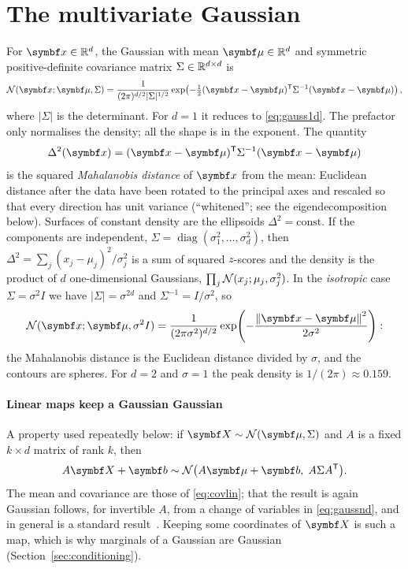 \documentclass[11pt]{article}
\begin{document}
\section{The multivariate Gaussian}\label{sec:gaussnd}

For $\x \in \R^d$, the Gaussian with mean $\vmu \in \R^d$ and symmetric positive-definite covariance matrix
$\Sigma \in \mathbb{R}^{d \times d}$ is
\begin{equation}\label{eq:gaussnd}
  \Normal(\x; \vmu, \Sigma) = \frac{1}{(2\pi)^{d/2} \lvert\Sigma\rvert^{1/2}}
  \exp\!\left( -\tfrac12 (\x - \vmu)\T \Sigma^{-1} (\x - \vmu) \right),
\end{equation}
where $\lvert\Sigma\rvert$ is the determinant. For $d = 1$ it reduces to \eqref{eq:gauss1d}. The prefactor only
normalises the density; all the shape is in the exponent. The quantity
\[
  \Delta^2(\x) = (\x - \vmu)\T \Sigma^{-1} (\x - \vmu)
\]
is the squared \emph{Mahalanobis distance} of $\x$ from the mean: Euclidean distance after the data have been
rotated to the principal axes and rescaled so that every direction has unit variance (``whitened''; see the
eigendecomposition below). Surfaces of constant density are the ellipsoids
$\Delta^2 = \text{const}$. If the components are independent, $\Sigma = \operatorname{diag}(\sigma_1^2, \dots,
\sigma_d^2)$, then $\Delta^2 = \sum_j (x_j - \mu_j)^2/\sigma_j^2$ is a sum of squared $z$-scores and the density is
the product of $d$ one-dimensional Gaussians, $\prod_j \mathcal{N}(x_j; \mu_j, \sigma_j^2)$. In the \emph{isotropic} case
$\Sigma = \sigma^2 I$ we have $\lvert\Sigma\rvert = \sigma^{2d}$ and $\Sigma^{-1} = I/\sigma^2$, so
\begin{equation}\label{eq:gaussiso}
  \Normal(\x; \vmu, \sigma^2 I) = \frac{1}{(2\pi\sigma^2)^{d/2}} \exp\!\left( -\frac{\norm{\x - \vmu}^2}{2\sigma^2} \right):
\end{equation}
the Mahalanobis distance is the Euclidean distance divided by $\sigma$, and the contours are spheres. For $d = 2$
and $\sigma = 1$ the peak density is $1/(2\pi) \approx 0.159$.

\paragraph{Linear maps keep a Gaussian Gaussian} A property used repeatedly below: if $\X \sim \Normal(\vmu, \Sigma)$
and $A$ is a fixed $k \times d$ matrix of rank $k$, then
\begin{equation}\label{eq:gausslin}
  A\X + \vect{b} \sim \Normal\big(A\vmu + \vect{b},\; A\Sigma A\T\big).
\end{equation}
The mean and covariance are those of \eqref{eq:covlin}; that the result is again Gaussian follows, for invertible
$A$, from a change of variables in \eqref{eq:gaussnd}, and in general is a standard result~\cite{bishop2006}.
Keeping some coordinates of $\X$ is such a map, which is why marginals of a Gaussian are Gaussian
(Section~\ref{sec:conditioning}).
\end{document}
